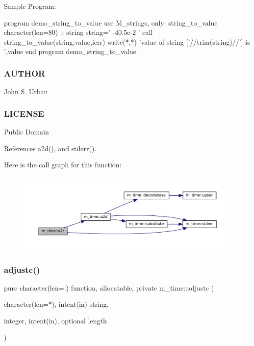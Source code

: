 \begin{DoxyVerb}Sample Program:

 program demo_string_to_value
 use M_strings, only: string_to_value
 character(len=80) :: string
    string=' -40.5e-2 '
    call string_to_value(string,value,ierr)
    write(*,*) 'value of string ['//trim(string)//'] is ',value
 end program demo_string_to_value
\end{DoxyVerb}
 \subsubsection*{A\+U\+T\+H\+OR}

John S. Urban \subsubsection*{L\+I\+C\+E\+N\+SE}

Public Domain 

References a2d(), and stderr().

Here is the call graph for this function\+:\nopagebreak
\begin{figure}[H]
\begin{center}
\leavevmode
\includegraphics[width=350pt]{namespacem__time_a85f3492133b49248e415771ff4da0b95_cgraph}
\end{center}
\end{figure}
\mbox{\label{namespacem__time_a9b165bc2207c694474bff6c7f56dfb09}} 
\subsubsection{\texorpdfstring{adjustc()}{adjustc()}}
{\footnotesize\ttfamily pure character(len=\+:) function, allocatable, private m\+\_\+time\+::adjustc (\begin{DoxyParamCaption}\item[{character(len=$\ast$), intent(in)}]{string,  }\item[{integer, intent(in), optional}]{length }\end{DoxyParamCaption})\hspace{0.3cm}{\ttfamily [private]}}



